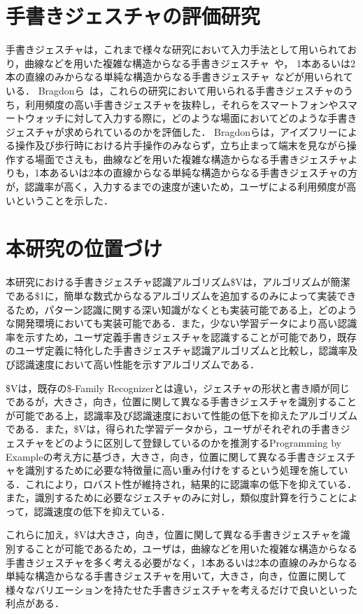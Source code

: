 \section{手書きジェスチャの評価研究}
手書きジェスチャは，これまで様々な研究において入力手法として用いられており，曲線などを用いた複雑な構造からなる手書きジェスチャ~\cite{Lu:2011:GAT:1978942.1978972,Li:2010:GST:1866029.1866044,Moran:1997:PIT:263407.263508,Hinckley:2007:ISS:1240624.1240666,Appert:2009:USC:1518701.1519052,Liao:2008:PGC:1314683.1314686,Zeleznik:2008:LCD:1449715.1449741}や，
1本あるいは2本の直線のみからなる単純な構造からなる手書きジェスチャ~\cite{Kurtenbach:1993:LEP:164632.164977}などが用いられている．
Bragdonら~\cite{Bragdon:2011:EAT:1978942.1979000}は，これらの研究において用いられる手書きジェスチャのうち，利用頻度の高い手書きジェスチャを抜粋し，それらをスマートフォンやスマートウォッチに対して入力する際に，どのような場面においてどのような手書きジェスチャが求められているのかを評価した．
Bragdonらは，アイズフリーによる操作及び歩行時における片手操作のみならず，立ち止まって端末を見ながら操作する場面でさえも，曲線などを用いた複雑な構造からなる手書きジェスチャよりも，1本あるいは2本の直線からなる単純な構造からなる手書きジェスチャの方が，認識率が高く，入力するまでの速度が速いため，ユーザによる利用頻度が高いということを示した．

\section{本研究の位置づけ}
本研究における手書きジェスチャ認識アルゴリズム\$Vは，アルゴリズムが簡潔である\$1に，簡単な数式からなるアルゴリズムを追加するのみによって実装できるため，パターン認識に関する深い知識がなくとも実装可能である上，どのような開発環境においても実装可能である．また，少ない学習データにより高い認識率を示すため，ユーザ定義手書きジェスチャを認識することが可能であり，既存のユーザ定義に特化した手書きジェスチャ認識アルゴリズムと比較し，認識率及び認識速度において高い性能を示すアルゴリズムである．

\$Vは，既存の\$-Family Recognizerとは違い，ジェスチャの形状と書き順が同じであるが，大きさ，向き，位置に関して異なる手書きジェスチャを識別することが可能である上，認識率及び認識速度において性能の低下を抑えたアルゴリズムである．また，\$Vは，得られた学習データから，ユーザがそれぞれの手書きジェスチャをどのように区別して登録しているのかを推測するProgramming by Exampleの考え方に基づき，大きさ，向き，位置に関して異なる手書きジェスチャを識別するために必要な特徴量に高い重み付けをするという処理を施している．これにより，ロバスト性が維持され，結果的に認識率の低下を抑えている．また，識別するために必要なジェスチャのみに対し，類似度計算を行うことによって，認識速度の低下を抑えている．

これらに加え，\$Vは大きさ，向き，位置に関して異なる手書きジェスチャを識別することが可能であるため，ユーザは，曲線などを用いた複雑な構造からなる手書きジェスチャを多く考える必要がなく，1本あるいは2本の直線のみからなる単純な構造からなる手書きジェスチャを用いて，大きさ，向き，位置に関して様々なバリエーションを持たせた手書きジェスチャを考えるだけで良いといった利点がある．





